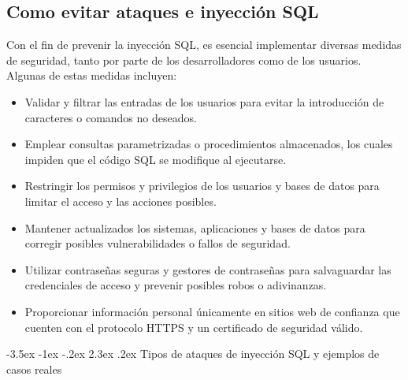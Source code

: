 \documentclass[11pt]{report}
\makeatletter
\renewcommand\chapter{\@startsection{chapter}{0}{\z@}%
    {-3.5ex \@plus -1ex \@minus -.2ex}%
    {2.3ex \@plus.2ex}%
    {\normalfont\Large\bfseries}}
\makeatother
\begin{document}
\subsection{Como evitar ataques e inyección SQL}
Con el fin de prevenir la inyección SQL, es esencial implementar diversas medidas de
seguridad, tanto por parte de los desarrolladores como de los usuarios. Algunas de estas
medidas incluyen:
\begin{itemize}
\item Validar y filtrar las entradas de los usuarios para evitar la introducción de caracteres
o comandos no deseados.
\item Emplear consultas parametrizadas o procedimientos almacenados, los cuales
impiden que el código SQL se modifique al ejecutarse.
\item Restringir los permisos y privilegios de los usuarios y bases de datos para limitar el
acceso y las acciones posibles.
\item Mantener actualizados los sistemas, aplicaciones y bases de datos para corregir
posibles vulnerabilidades o fallos de seguridad.
\item Utilizar contraseñas seguras y gestores de contraseñas para salvaguardar las
credenciales de acceso y prevenir posibles robos o adivinanzas.
\item Proporcionar información personal únicamente en sitios web de confianza que
cuenten con el protocolo HTTPS y un certificado de seguridad válido.
\end{itemize}

\cleardoublepage

\chapter{Tipos de ataques de inyección SQL y ejemplos de casos reales }
\end{document}
